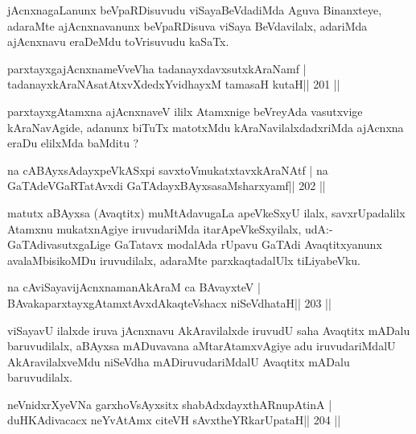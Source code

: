 \begin{artha}
jAcnxnagaLanunx beVpaRDisuvudu viSayaBeVdadiMda Aguva Binanxteye, adaraMte ajAcnxnavanunx beVpaRDisuva viSaya BeVdavilalx, adariMda ajAcnxnavu eraDeMdu toVrisuvudu kaSaTx.
\end{artha}


\begin{shl}
parxtayxgajAcnxnameVveVha tadanayxdavxsutxkAraNamf |
tadanayxkAraNAsatAtxvXdedxYvidhayxM tamasaH kutaH\hfill || 201 ||
\end{shl}

\begin{artha}
parxtayxgAtamxna ajAcnxnaveV ililx Atamxnige beVreyAda vasutxvige kAraNavAgide, adanunx biTuTx matotxMdu kAraNavilalxdadxriMda ajAcnxna eraDu elilxMda baMditu ?
\end{artha}

\begin{shl}
na cABAyxsAdayxpeVkASx\s pi savxtoVmukatxtavxkAraNAtf |
na GaTAdeVGaRTatAvxdi GaTAdayxBAyxsasaMsharxyamf\hfill || 202 ||
\end{shl}

\begin{artha}
matutx aBAyxsa (Avaqtitx) muMtAdavugaLa apeVkeSxyU ilalx, savxrUpadalilx Atamxnu mukatxnAgiye iruvudariMda itarApeVkeSxyilalx, udA:- GaTAdivasutxgaLige GaTatavx modalAda rUpavu GaTAdi Avaqtitxyanunx avalaMbisikoMDu iruvudilalx, ada\-raMte parxkaqtadalUlx tiLiyabeVku.
\end{artha}

\begin{shl}
na cAviSayavijAcnxnamanAkAraM ca BAvayxteV |
BAvakaparxtayxgAtamxtAvxdAkaqteVshacx niSeVdhataH\hfill || 203 ||
\end{shl}

\begin{artha}
viSayavU ilalxde iruva jAcnxnavu AkAravilalxde iruvudU saha Avaqtitx mADalu baruvudilalx, aBAyxsa mADuvavana aMtarAtamxvAgiye adu iruvu\-dariMdalU AkAravilalxveMdu niSeVdha mADiruvudariMdalU Avaqtitx mADalu baruvudilalx.
\end{artha}


\begin{shl}
neVnidxrXyeVNa garxhoV\s sAyxsitx shabAdxdayxthARnupAtinA |
duHKAdivacacx neYvA\s\s tAmx citeVH sAvxtheYRkarUpataH\hfill || 204 ||
\end{shl}

